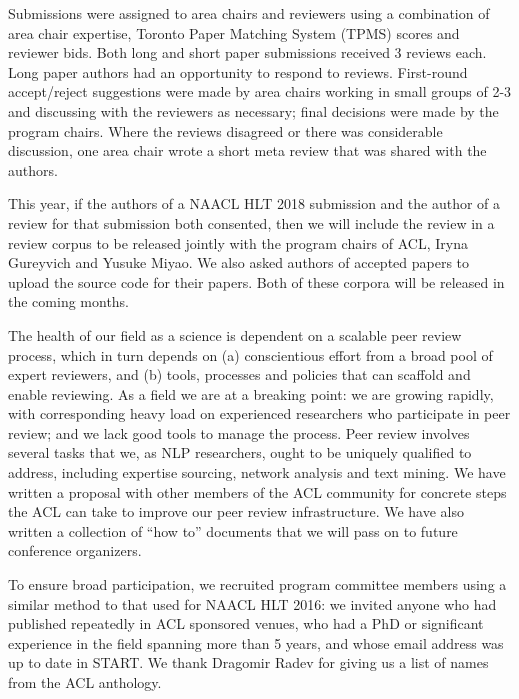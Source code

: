 Submissions were assigned to area chairs and reviewers using a combination of area chair expertise, Toronto Paper Matching System (TPMS) scores and reviewer bids. Both long and short paper submissions received 3 reviews each. Long paper authors had an opportunity to respond to reviews. First-round accept/reject suggestions were made by area chairs working in small groups of 2-3 and discussing with the reviewers as necessary; final decisions were made by the program chairs. Where the reviews disagreed or there was considerable discussion, one area chair wrote a short meta review that was shared with the authors. 

This year, if the authors of a NAACL HLT 2018 submission and the author of a review for that submission both consented, then we will include the review in a review corpus to be released jointly with the program chairs of ACL, Iryna Gureyvich and Yusuke Miyao. We also asked authors of accepted papers to upload the source code for their papers. Both of these corpora will be released in the coming months.

The health of our field as a science is dependent on a scalable peer review process, which in turn depends on (a) conscientious effort from a broad pool of expert reviewers, and (b)  tools, processes and policies that can scaffold and enable reviewing. As a field we are at a breaking point: we are growing rapidly, with corresponding  heavy load on experienced researchers who participate in peer review; and we lack good tools to manage the process. Peer review involves several tasks that we, as NLP researchers, ought to be uniquely qualified to address, including expertise sourcing, network analysis and text mining. We have written a proposal with other members of the ACL community for concrete steps the ACL can take to improve our peer review infrastructure. We have also written a collection of ``how to'' documents that we will pass on to future conference organizers. 

 To ensure broad participation, we recruited program committee members using a similar method to that used for NAACL HLT 2016: we invited anyone who had published repeatedly in ACL sponsored venues, who had a PhD or significant experience in the field spanning more than 5 years, and whose email address was up to date in START. We thank Dragomir Radev for giving us a list of names from the ACL anthology. 

